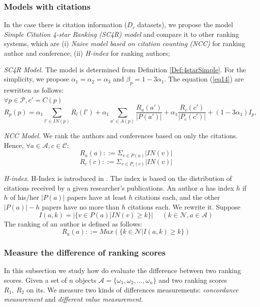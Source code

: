 \documentclass[10pt,leqno,twoside]{article}
\begin{document}
\subsubsection{Models with citations}
In the case there is citation information ($D_c$ datasets), we propose the model \textit{Simple Citation 4-star Ranking (SC4R) model} and compare it to other ranking systems, which are (i) \textit{Naive model based on citation counting (NCC)} for ranking author and conference; (ii) \textit{H-index} for ranking authors;

\textit{SC4R Model.} The model is determined from Definition \ref{Def:4starSimple}.
For the simplicity, we propose $\alpha_1=\alpha_2=\alpha_3$ and $\beta_p = 1-3\alpha_1 $.  The equation (\ref{eq14}) are rewritten as follows:\\ $\forall p\in\mathcal{P}, c' = C(p)$
\begin{equation}\label{eq16}
R_p(p) = \alpha_1\sum_{l'\in IN(p)}R_l(l') + \alpha_1\sum_{a'\in A(p)}\frac{R_a(a')}{|P(a')|} + \alpha_1\frac{R_c(c')}{|P_c(c')|} + (1-3\alpha_1)I_p,
\end{equation}


\textit{NCC Model.} We rank the authors and conferences based on only the citations.  Hence,
 $\forall a \in \mathcal{A}, c \in \mathcal{C}:$
\begin{equation}
R_a(a) ::= \Sigma_{v \in P(a)}|IN(v)|
\end{equation}
\begin{equation}
R_c(c) ::= \Sigma_{v \in P_c(c)} |IN(v)|
\end{equation}

\textit{H-index}. H-Index is introduced in \cite{HIndex06,HIndex}. The index is based on the distribution of citations received by a given researcher's publications. An author $a$ has index $h$ if $h$ of his/her $|P(a)|$ papers have at least $h$ citations each, and the other $|P(a)|-h$ papers have no more than $h$ citations each. We rewrite it.
Suppose $$I(a,k)=|\{ v \in P(a)|IN(v) \geq k\}| ~~~~~~(k \in \mathcal{N}, a \in \mathcal{A})$$
The ranking of an author is defined as follows:
\begin{equation}
R_a(a) ::= Max(\{k \in \mathcal{N}| I(a,k)\geq k\})
\end{equation}



\subsubsection{Measure the difference of ranking scores}
In this subsection we study how do evaluate the difference between two ranking scores. Given a set of $n$ objects $\mathcal{A} = \{\omega_1,\omega_2,\ldots,\omega_n\}$ and two ranking scores $R_1,~R_2$ on its.
We measure two kinds of differences measurements: \textit{concordance measurement} and \textit{different value measurement}.
\end{document}
